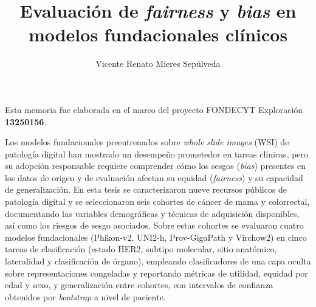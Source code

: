 \documentclass[dosguias,openany]{tesisusach}
\title{Evaluación de \textit{fairness} y \textit{bias} en modelos fundacionales clínicos}
\author{Vicente Renato Mieres Sepúlveda}
\date{\the\year}
\begin{document}
	\maketitle
	\frontmatter
	
	\thispagestyle{empty}
	\vspace*{1cm}
	\noindent Esta memoria fue elaborada en el marco del proyecto FONDECYT Exploración \textbf{13250156}.
	\newpage

	\begin{resumenEs}
		Los modelos fundacionales preentrenados sobre \textit{whole slide images} (WSI) de patología digital han mostrado un desempeño prometedor en tareas clínicas, pero su adopción responsable requiere comprender cómo los sesgos (\textit{bias}) presentes en los datos de origen y de evaluación afectan su equidad (\textit{fairness}) y su capacidad de generalización. En esta tesis se caracterizaron nueve recursos públicos de patología digital y se seleccionaron seis cohortes de cáncer de mama y colorrectal, documentando las variables demográficas y técnicas de adquisición disponibles, así como los riesgos de sesgo asociados. Sobre estas cohortes se evaluaron cuatro modelos fundacionales (Phikon-v2, UNI2-h, Prov-GigaPath y Virchow2) en cinco tareas de clasificación (estado HER2, subtipo molecular, sitio anatómico, lateralidad y clasificación de órgano), empleando clasificadores de una capa oculta sobre representaciones congeladas y reportando métricas de utilidad, equidad por edad y sexo, y generalización entre cohortes, con intervalos de confianza obtenidos por \textit{bootstrap} a nivel de paciente.
	\end{resumenEs}
	
\end{document}
